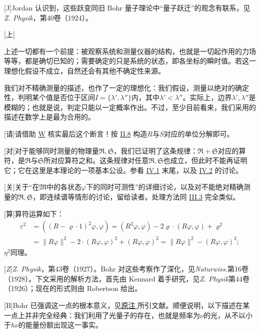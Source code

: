 \documentclass[fontsize=13pt,twoside,openany,headings=normal,parskip=false,bookmarkpackage=false,DIV=calc]{scrbook}
\begin{document}
[J]{Jordan 认识到，这些跃变同旧 Bohr 量子理论中“量子跃迁”的观念有联系，见\emph{Z. Physik}，第40卷（1924）。}

[上]{上述一切都有一个前提：被观察系统和测量仪器的结构，也就是一切起作用的力场等等，都是确切已知的；需要确定的只是系统的状态，即各坐标的瞬时值。若这一理想化假设不成立，自然还会有其他不确定性来源。

我们对不精确测量的描述，也作了一定的理想化：我们假设，测量以绝对的确定性，判明某个值是否位于区间$I=\{\lambda',\allowbreak \lambda''\}$内，其中$\lambda'<\lambda''$。实际上，边界$\lambda',\allowbreak \lambda''$是模糊的；也就是说，判定只能以一定概率作出。不过，至少目前看来，我们采用的描述在数学上是最为合用的。}

[请]{请借助 \hyperref[post:III.1.W]{W} 核实最后这个断言！按 \hyperref[sec:II.8]{II.8} 构造$R$与$S$对应的单位分解即可。}

[对]{对于能够同时测量的物理量$\mathfrak R,\allowbreak \mathfrak S$，我们已证明了这条规律：$\mathfrak R+\mathfrak S$对应的算符，是$\mathfrak R$与$\mathfrak S$所对应算符之和。这条规律对任意$\mathfrak R,\allowbreak \mathfrak S$也成立，但此时不能再证明它；它在这里是本理论的一项基本公设。参看 \hyperref[sec:IV.1]{IV.1} 末尾，以及 \hyperref[sec:IV.2]{IV.2} 的讨论。}

[关]{关于“在$\mathfrak M$中的各状态$\varphi$下的同时可测性”的详细讨论，以及对不能绝对精确测量的$\mathfrak R,\allowbreak \mathfrak S$，即连续谱等情形的讨论，留给读者。处理方法同 \hyperref[sec:III.3]{III.3} 完全类似。}

[算]{算符运算如下：
\begin{align*}
\varepsilon^2&=((R-\varrho\cdot1)^2\varphi,\varphi)
=(R^2\varphi,\varphi)-2\varrho\cdot(R\varphi,\varphi)+\varrho^2\\
&=\|R\varphi\|^2-2\cdot(R\varphi,\varphi)^2+(R\varphi,\varphi)^2
=\|R\varphi\|^2-(R\varphi,\varphi)^2;
\end{align*}
$\eta^2$同理。}

[\emph{Z}]{\emph{Z. Physik}，第43卷（1927）。Bohr 对这些考察作了深化，见\emph{Naturwiss.}第16卷（1928）。下文采用的解析方法，首先由 Kennard 着手研究，见\emph{Z. Physik}第44卷（1926）；现在的形式则由 Robertson 给出。}

[B]{Bohr 已强调这一点的根本意义，见\CJKglue \hyperlink{note-131}{原注 } 所引文献。顺便说明，以下描述在某一点上并非完全经典：我们利用了光量子的存在，也就是频率为$\nu$的光，从不以小于$h\nu$的能量份额出现这一事实。}
\end{document}
